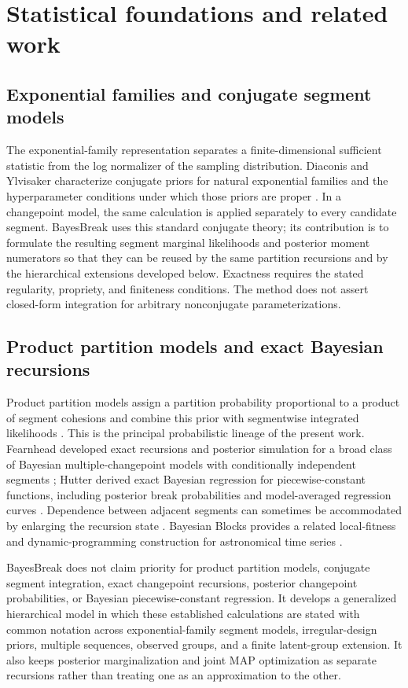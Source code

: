 \section{Statistical foundations and related work}
\label{sec:related}

\subsection{Exponential families and conjugate segment models}
The exponential-family representation separates a finite-dimensional sufficient statistic from the log normalizer of the sampling distribution. Diaconis and Ylvisaker characterize conjugate priors for natural exponential families and the hyperparameter conditions under which those priors are proper \citep{diaconis1979conjugate}. In a changepoint model, the same calculation is applied separately to every candidate segment. BayesBreak uses this standard conjugate theory; its contribution is to formulate the resulting segment marginal likelihoods and posterior moment numerators so that they can be reused by the same partition recursions and by the hierarchical extensions developed below. Exactness requires the stated regularity, propriety, and finiteness conditions. The method does not assert closed-form integration for arbitrary nonconjugate parameterizations.

\subsection{Product partition models and exact Bayesian recursions}
Product partition models assign a partition probability proportional to a product of segment cohesions and combine this prior with segmentwise integrated likelihoods \citep{barry1992ppm,barry1993bayesCP}. This is the principal probabilistic lineage of the present work. Fearnhead developed exact recursions and posterior simulation for a broad class of Bayesian multiple-changepoint models with conditionally independent segments \citep{fearnhead2006exact}; Hutter derived exact Bayesian regression for piecewise-constant functions, including posterior break probabilities and model-averaged regression curves \citep{hutter2006bpcr}. Dependence between adjacent segments can sometimes be accommodated by enlarging the recursion state \citep{fearnhead2011dependence}. Bayesian Blocks provides a related local-fitness and dynamic-programming construction for astronomical time series \citep{scargle2013bayesianblocks}.

BayesBreak does not claim priority for product partition models, conjugate segment integration, exact changepoint recursions, posterior changepoint probabilities, or Bayesian piecewise-constant regression. It develops a generalized hierarchical model in which these established calculations are stated with common notation across exponential-family segment models, irregular-design priors, multiple sequences, observed groups, and a finite latent-group extension. It also keeps posterior marginalization and joint MAP optimization as separate recursions rather than treating one as an approximation to the other.

